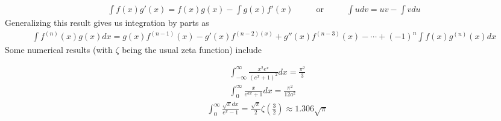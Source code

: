 \begin{align}
\int f(x)g'(x)=f(x)g(x)-\int g(x)f'(x) \hspace{1cm}\textrm{ or }\hspace{1cm} \int udv=uv-\int vdu
\end{align} 
Generalizing this result gives us integration by parts as
\begin{align}
\int f^{(n)}(x)g(x) dx = g(x)f^{(n-1)}(x)-g'(x)f^{(n-2)(x)} + g''(x)f^{(n-3)}(x) - \cdots +(-1)^n \int f(x)g^{(n)}(x)dx
\end{align}
Some numerical results (with $\zeta$ being the usual zeta function) include
\begin{multicols}{2}
	\noindent
	\begin{align}
		&\int_{-\infty}^{\infty} \frac{x^2e^x}{(e^x+1)^2}dx=\frac{\pi^2}{3} \\
		&\int_{0}^{\infty} \frac{x}{e^{ax}+1}dx=\frac{\pi^2}{12a^2}
	\end{align}
	\begin{align}
	&\int_{0}^{\infty} \frac{\sqrt{x}dx}{e^x-1}=\frac{\sqrt{\pi}}{2}\zeta\left(\frac{3}{2}\right)\approx1.306\sqrt{\pi} 
	\end{align}
\end{multicols}


\newpage

